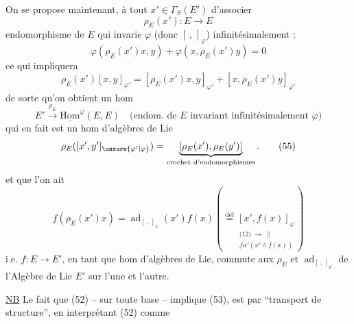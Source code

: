 On se propose maintenant, à tout $x'\in\Gamma_S(E')$ d'associer
\[
 \rho_E(x'):E\longrightarrow E \tag*{(51)}
\]
 endomorphisme de $E$ qui invarie $\varphi$ (donc $[\, ,\,]_\varphi$) infinitésimalement :
\[
 \varphi(\rho_E(x')x,y)+\varphi(x,\rho_E(x')y)=0 \tag*{(52)}
\]
ce qui impliquera
\[
 \rho_E(x')[x,y]_{\varphi'}=[\rho_E(x')x,y]_{\varphi'}+[x,\rho_E(x')y]_{\varphi'} \tag*{(53)}
\]
de sorte qu'on obtient un hom
\[
 E'\xrightarrow{\rho_E}\underline{\mathrm{Hom}}^{\varphi}(E,E)
 \quad\text{(endom. de $E$ invariant infinitésimalement $\varphi$)} \tag*{(54)}
\]
qui en fait est un hom d'algèbres de Lie
\[
 \rho_E([x',y']_{\unsure{\varphi'|\varphi}})=
 \underbrace{[\rho_E(x'),\rho_E(y')]}_{\text{crochet d'endomorphismes}}. \tag*{(55)}
\]
 et que l'on ait
\[
 f(\rho_E(x')x)=\operatorname{ad}_{[\, ,\,]_\varphi}(x')f(x)
 \left(\overset{\text{déf}}{=}
 \underset{\substack{\text{(12)}\ \longrightarrow\ \parallel\\ f\alpha'(x'\wedge f(x))}}{[x',f(x)]_\varphi}\right) \tag*{(56)}
\]
i.e. $f:E\longrightarrow E'$, en tant que hom d'algèbres de Lie, commute aux   $\rho_E$ et $\operatorname{ad}_{[\, ,\,]_\varphi}$ de l'Algèbre de Lie $E'$ sur l'une et l'autre.

\uline{NB} Le fait que (52) -- sur toute base -- implique (53), est  par ``transport de structure'', en interprétant (52) comme

